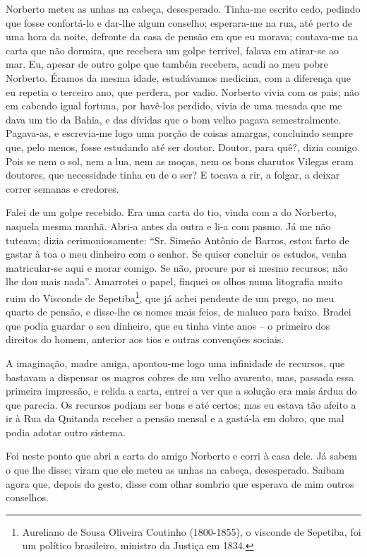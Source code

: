 Norberto meteu as unhas na cabeça, desesperado. Tinha-me escrito cedo,
pedindo que fosse confortá-lo e dar-lhe algum conselho; esperara-me na
rua, até perto de uma hora da noite, defronte da casa de pensão em que
eu morava; contava-me na carta que não dormira, que recebera um golpe
terrível, falava em atirar-se ao mar. Eu, apesar de outro golpe que
também recebera, acudi ao meu pobre Norberto. Éramos da mesma idade,
estudávamos medicina, com a diferença que eu repetia o terceiro ano, que
perdera, por vadio. Norberto vivia com os pais; não em cabendo igual
fortuna, por havê-los perdido, vivia de uma mesada que me dava um tio da
Bahia, e das dívidas que o bom velho pagava semestralmente. Pagava-as, e
escrevia-me logo uma porção de coisas amargas, concluindo sempre que,
pelo menos, fosse estudando até ser doutor. Doutor, para quê?, dizia
comigo. Pois se nem o sol, nem a lua, nem as moças, nem os bons charutos
Vilegas eram doutores, que necessidade tinha eu de o ser? E tocava a
rir, a folgar, a deixar correr semanas e credores.

Falei de um golpe recebido. Era uma carta do tio, vinda com a do
Norberto, naquela mesma manhã. Abri-a antes da outra e li-a com pasmo.
Já me não tuteava; dizia cerimoniosamente: ``Sr. Simeão Antônio de
Barros, estou farto de gastar à toa o meu dinheiro com o senhor. Se
quiser concluir os estudos, venha matricular-se aqui e morar comigo. Se
não, procure por si mesmo recursos; não lhe dou mais nada''. Amarrotei o
papel, finquei os olhos numa litografia muito ruim do Visconde de
Sepetiba\footnote{Aureliano de Sousa Oliveira Coutinho (1800-1855), o
  visconde de Sepetiba, foi um político brasileiro, ministro da Justiça
  em 1834.}, que já achei pendente de um prego, no meu quarto de pensão,
e disse-lhe os nomes mais feios, de maluco para baixo. Bradei que podia
guardar o seu dinheiro, que eu tinha vinte anos -- o primeiro dos
direitos do homem, anterior aos tios e outras convenções sociais.

A imaginação, madre amiga, apontou-me logo uma infinidade de recursos,
que bastavam a dispensar os magros cobres de um velho avarento, mas,
passada essa primeira impressão, e relida a carta, entrei a ver que a
solução era mais árdua do que parecia. Os recursos podiam ser bons e até
certos; mas eu estava tão afeito a ir à Rua da Quitanda receber a pensão
mensal e a gastá-la em dobro, que mal podia adotar outro sistema.

Foi neste ponto que abri a carta do amigo Norberto e corri à casa dele.
Já sabem o que lhe disse; viram que ele meteu as unhas na cabeça,
desesperado. Saibam agora que, depois do gesto, disse com olhar sombrio
que esperava de mim outros conselhos.


